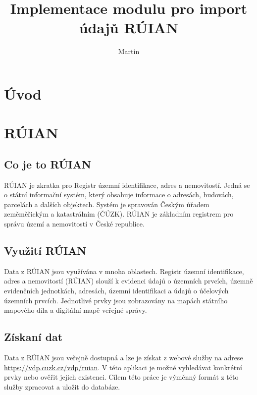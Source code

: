 \documentclass[czech, kiv, ba, he, iso690alph, pdf]{fasthesis}
\title{Implementace modulu pro import údajů RÚIAN}
\author{Martin}{Schön}{}{}
\begin{document}
\frontpages[tm]
\tableofcontents
\chapter{Úvod}

\chapter{RÚIAN}
\section{Co je to RÚIAN}
RÚIAN je zkratka pro Registr územní identifikace, adres a nemovitostí. 
Jedná se o státní informační systém, který obsahuje informace o adresách, budovách, parcelách a dalších objektech. 
Systém je spravován Českým úřadem zeměměřickým a katastrálním (ČÚZK). 
RÚIAN je základním registrem pro správu území a nemovitostí v České republice.

\section{Využití RÚIAN}
Data z RÚIAN jsou využívána v mnoha oblastech.
Registr územní identifikace, adres a nemovitostí (RÚIAN) slouží k evidenci údajů o územních prvcích, 
územně evidenčních jednotkách, adresách, územní identifikaci a údajů o účelových územních prvcích. 
Jednotlivé prvky jsou zobrazovány na mapách státního mapového díla a digitální mapě veřejné správy.

\section{Získaní dat}
Data z RÚIAN jsou veřejně dostupná a lze je získat z webové služby na adrese \url{https://vdp.cuzk.cz/vdp/ruian}.
V této aplikaci je možné vyhledávat konkrétní prvky nebo ověřit jejich existenci.
Cílem této práce je výměnný formát z této služby zpracovat a uložit do databáze.
\end{document}
